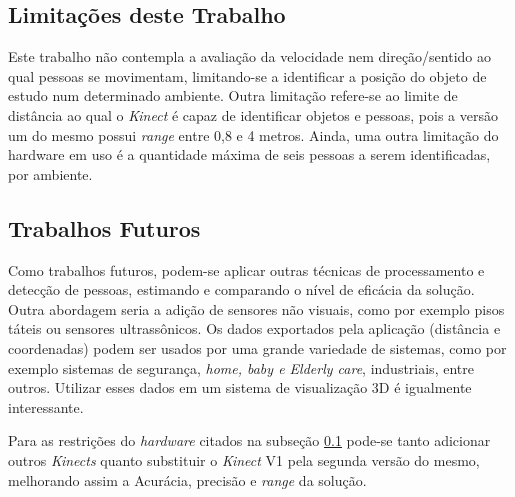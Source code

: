 \subsection{Limitações deste Trabalho}\label{sec:limitacoes}
Este trabalho não contempla a avaliação da velocidade nem direção/sentido ao qual pessoas se movimentam, limitando-se a identificar a posição do objeto de estudo num determinado ambiente.
Outra limitação refere-se ao limite de distância ao qual o \textit{Kinect} é capaz de identificar objetos e pessoas, pois a versão um do mesmo possui \textit{range} entre 0,8 e 4 metros. Ainda, uma outra limitação do hardware em uso é a quantidade máxima de seis pessoas a serem identificadas, por ambiente.

\subsection{Trabalhos Futuros}
Como trabalhos futuros, podem-se aplicar outras técnicas de processamento e detecção de pessoas, estimando e comparando o nível de eficácia da solução. Outra abordagem seria a adição de sensores não visuais, como por exemplo pisos táteis ou sensores ultrassônicos. Os dados exportados pela aplicação (distância e coordenadas) podem ser usados por uma grande variedade de sistemas, como por exemplo sistemas de segurança, \textit{home, baby e Elderly care}, industriais, entre outros. Utilizar esses dados em um sistema de visualização 3D é igualmente interessante.

Para as restrições do \textit{hardware} citados na subseção \ref{sec:limitacoes} pode-se tanto adicionar outros \textit{Kinects} quanto substituir o \textit{Kinect} V1 pela segunda versão do mesmo, melhorando assim a Acurácia, precisão e \textit{range} da solução.
